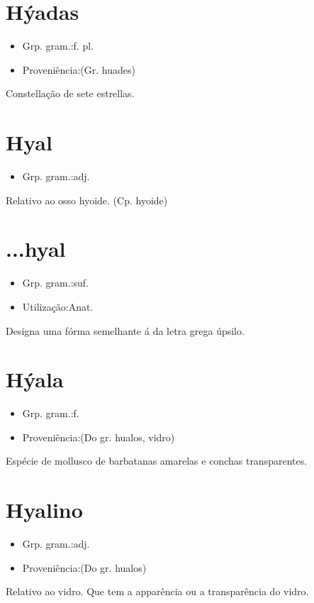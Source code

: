 \documentclass{article}
\begin{document}
\section{Hýadas}
\begin{itemize}
\item {Grp. gram.:f. pl.}
\end{itemize}
\begin{itemize}
\item {Proveniência:(Gr. \textunderscore huades\textunderscore )}
\end{itemize}
Constellação de sete estrellas.
\section{Hyal}
\begin{itemize}
\item {Grp. gram.:adj.}
\end{itemize}
Relativo ao osso hyoide.
(Cp. \textunderscore hyoide\textunderscore )
\section{...hyal}
\begin{itemize}
\item {Grp. gram.:suf.}
\end{itemize}
\begin{itemize}
\item {Utilização:Anat.}
\end{itemize}
Designa uma fórma semelhante á da letra grega úpsilo.
\section{Hýala}
\begin{itemize}
\item {Grp. gram.:f.}
\end{itemize}
\begin{itemize}
\item {Proveniência:(Do gr. \textunderscore hualos\textunderscore , vidro)}
\end{itemize}
Espécie de mollusco de barbatanas amarelas e conchas transparentes.
\section{Hyalino}
\begin{itemize}
\item {Grp. gram.:adj.}
\end{itemize}
\begin{itemize}
\item {Proveniência:(Do gr. \textunderscore hualos\textunderscore )}
\end{itemize}
Relativo ao vidro.
Que tem a apparência ou a transparência do vidro.
\end{document}
